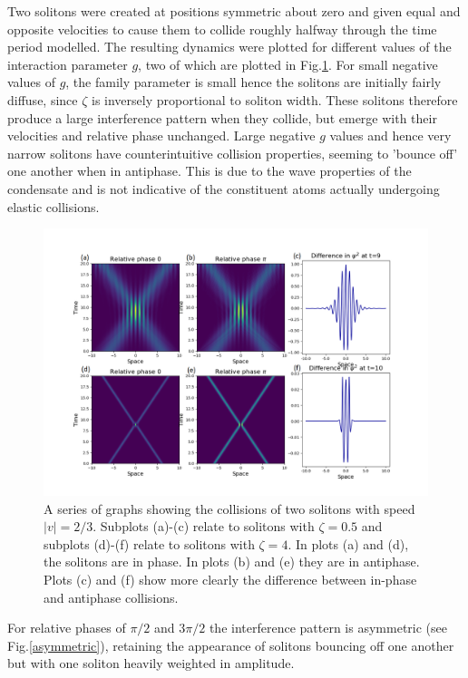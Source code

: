 \documentclass[10pt, twocolumn]{revtex4}    %
\begin{document}
Two solitons were created at positions symmetric about zero and given equal and opposite velocities to cause them to collide roughly halfway through the time period modelled. The resulting dynamics were plotted for different values of the interaction parameter $g$, two of which are plotted in Fig.\ref{collision}. For small negative values of $g$, the family parameter is small hence the solitons are initially fairly diffuse, since $\zeta$ is inversely proportional to soliton width. These solitons therefore produce a large interference pattern when they collide, but emerge with their velocities and relative phase unchanged. Large negative $g$ values and hence very narrow solitons have counterintuitive collision properties, seeming to 'bounce off' one another when in antiphase. This is due to the wave properties of the condensate and is not indicative of the constituent atoms actually undergoing elastic collisions. 

\begin{figure}
\includegraphics[width=\textwidth]{extensionpic.png}
\caption{A series of graphs showing the collisions of two solitons with speed $|v|=2/3$. Subplots (a)-(c) relate to solitons with $\zeta=0.5$ and subplots (d)-(f) relate to solitons with $\zeta=4$. In plots (a) and (d), the solitons are in phase. In plots (b) and (e) they are in antiphase. Plots (c) and (f) show more clearly the difference between in-phase and antiphase collisions.}
\label{collision}
\end{figure}

For relative phases of $\pi/2$ and $3\pi/2$ the interference pattern is asymmetric (see Fig.\ref{asymmetric}), retaining the appearance of solitons bouncing off one another but with one soliton heavily weighted in amplitude. 
\end{document}

